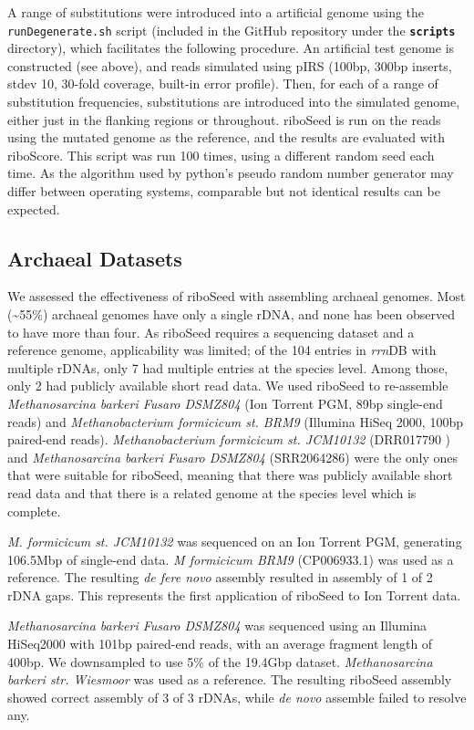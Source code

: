 \documentclass[10pt]{article}
\def \ttilde {\raisebox{-.5ex}\textasciitilde} %
\begin{document}
A range of substitutions were introduced into a artificial genome using the \texttt{runDegenerate.sh} script (included in the GitHub repository under the \textbf{\texttt{scripts}} directory), which facilitates the following procedure. An artificial test genome is constructed (see above), and reads simulated using pIRS (100bp, 300bp inserts, stdev 10, 30-fold coverage, built-in error profile).  Then, for each of a range of substitution frequencies, substitutions are introduced into the simulated genome, either just in the flanking regions or throughout. riboSeed is run on the reads using the mutated genome as the reference, and the results are evaluated with riboScore. This script was run 100 times, using a different random seed each time.  As the algorithm used by python's pseudo random number generator may differ between operating systems, comparable but not identical results can be expected.

\subsection*{Archaeal Datasets}
We assessed the effectiveness of riboSeed with assembling archaeal genomes. Most (\ttilde55\%) archaeal genomes have only a single rDNA, and none has been observed to have more than four. As riboSeed requires a sequencing dataset and a reference genome, applicability was limited; of the 104 entries in \textit{rrn}DB with multiple rDNAs, only 7 had multiple entries at the species level. Among those, only 2 had publicly available short read data. We used riboSeed to re-assemble \textit{Methanosarcina barkeri Fusaro DSMZ804} (Ion Torrent PGM, 89bp single-end reads) and \textit{Methanobacterium formicicum st. BRM9} (Illumina HiSeq 2000, 100bp paired-end reads). \textit{Methanobacterium formicicum st. JCM10132} (DRR017790 ) and \textit{Methanosarcina barkeri Fusaro DSMZ804} (SRR2064286) were the only ones that were suitable for riboSeed, meaning that there was publicly available short read data and that there is a related genome at the species level which is complete.


\textit{M. formicicum st. JCM10132} was sequenced on an Ion Torrent PGM, generating 106.5Mbp of single-end data. \textit{M formicicum BRM9} (CP006933.1) was used as a reference. The resulting \textit{de fere novo} assembly resulted in assembly of 1 of 2 rDNA gaps. This represents the first application of riboSeed to Ion Torrent data.


\textit{Methanosarcina barkeri Fusaro DSMZ804} was sequenced using an Illumina HiSeq2000 with 101bp paired-end reads, with an average fragment length of 400bp. We downsampled to use 5\% of the 19.4Gbp dataset. \textit{Methanosarcina barkeri str. Wiesmoor} was used as a reference. The resulting riboSeed assembly showed correct assembly of 3 of 3 rDNAs, while \textit{de novo} assemble failed to resolve any.
\end{document}
